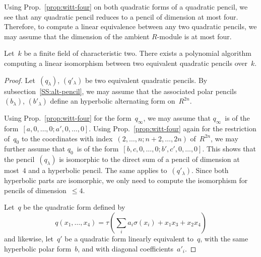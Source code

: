 \documentclass{lms}
\begin{document}
Using Prop.~\ref{prop:witt-four} on both quadratic forms of a quadratic
pencil, we see that any quadratic pencil reduces to a pencil of dimension
at most four.
Therefore, to compute a linear equivalence between any two quadratic
pencils, we may assume that the dimension of the ambient $R$-module is at
most four.

\begin{prop}\label{prop:ip1s-bin-polynomial}
Let~$k$ be a finite field of characteristic two.
There exists a polynomial algorithm computing a linear isomorphism between
two equivalent quadratic pencils over~$k$.
\end{prop}

\begin{proof}
Let~$(q_{λ})$, $(q'_{λ})$ be two equivalent quadratic pencils.
By subsection~\ref{SS:alt-pencil}, we may assume that
the associated polar pencils~$(b_{λ})$, $(b'_{λ})$
define an hyperbolic alternating form on~$R^{2n}$.

Using Prop.~\ref{prop:witt-four} for the form~$q_{∞}$,
we may assume that $q_{∞}$~is of the form~$[a, 0, …, 0; a', 0, …, 0]$.
Using Prop.~\ref{prop:witt-four} again for the restriction of~$q_{0}$
to the coordinates with index~$(2, …,  n; n+2, …, 2n)$ of~$R^{2n}$,
we may further assume that
$q_{0}$~is of the form~$[b, c, 0, …, 0; b', c', 0, …, 0]$.
This shows that the pencil~$(q_{λ})$ is isomorphic to
the direct sum of a pencil of dimension at most~$4$
and a hyperbolic pencil.
The same applies to~$(q'_{λ})$.
Since both hyperbolic parts are isomorphic,
we only need to compute the isomorphism for pencils of dimension~$≤ 4$.

Let~$q$ be the quadratic form defined by
\begin{equation}
q(x_1, …, x_4) = τ (∑_{i} a_i σ(x_i) + x_1 x_3 + x_2 x_4)
\end{equation}
and likewise, let~$q'$ be a quadratic form linearly equivalent to~$q$,
with the same hyperbolic polar form~$b$,
and with diagonal coefficients~$a'_i$.


\end{proof}
\end{document}
